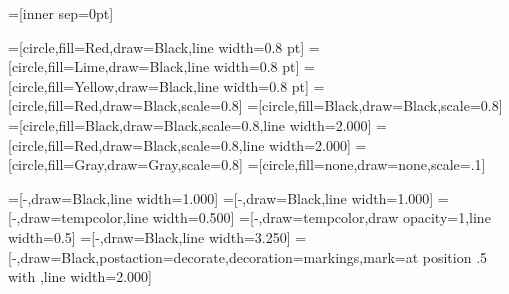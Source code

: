 

\usepackage[svgnames]{xcolor}
\usepackage{tikz}
\usetikzlibrary{decorations.markings}
\usetikzlibrary{shapes.geometric}

\newcommand\scaledLW{0.5} %

\newcommand\scaledNodeSize{0.5} %


=[inner sep=0pt]

=[circle,fill=Red,draw=Black,line width=0.8 pt]
=[circle,fill=Lime,draw=Black,line width=0.8 pt]
=[circle,fill=Yellow,draw=Black,line width=0.8 pt]
=[circle,fill=Red,draw=Black,scale=0.8]
=[circle,fill=Black,draw=Black,scale=0.8]
=[circle,fill=Black,draw=Black,scale=0.8,line width=2.000]
=[circle,fill=Red,draw=Black,scale=0.8,line width=2.000]
=[circle,fill=Gray,draw=Gray,scale=0.8]
=[circle,fill=none,draw=none,scale=.1]




=[-,draw=Black,line width=1.000]
=[-,draw=Black,line width=1.000]
=[-,draw=tempcolor,line width=0.500]
=[-,draw=tempcolor,draw opacity=1,line width=0.5]
=[-,draw=Black,line width=3.250]
=[-,draw=Black,postaction={decorate},decoration={markings,mark=at position .5 with {\arrow{>}}},line width=2.000]


